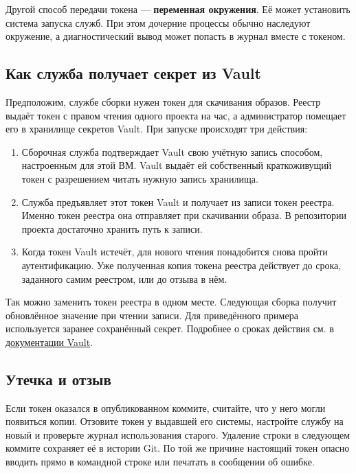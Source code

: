 Другой способ передачи токена --- \textbf{переменная окружения}.
Её может установить система запуска служб. При этом дочерние процессы
обычно наследуют окружение, а диагностический вывод  может
попасть в журнал вместе с токеном.

\subsection{Как служба получает секрет из Vault}

Предположим, службе сборки нужен токен для скачивания образов.
Реестр выдаёт токен с правом чтения одного проекта на час, а
администратор помещает его в хранилище секретов Vault. При запуске
происходят три действия:

\begin{enumerate}
  \item Сборочная служба подтверждает Vault свою учётную запись
    способом, настроенным для этой ВМ. Vault выдаёт ей собственный
    краткоживущий токен с разрешением читать нужную запись хранилища.
  \item Служба предъявляет этот токен Vault и получает из записи
    токен реестра. Именно токен реестра она отправляет при скачивании
    образа. В репозитории проекта достаточно хранить путь к записи.
  \item Когда токен Vault истечёт, для нового чтения понадобится снова
    пройти аутентификацию. Уже полученная копия токена реестра
    действует до срока, заданного самим реестром, или до отзыва в нём.
\end{enumerate}

Так можно заменить токен реестра в одном месте. Следующая сборка
получит обновлённое значение при чтении записи. Для приведённого
примера используется заранее сохранённый секрет. Подробнее о сроках
действия см. в \href{https://developer.hashicorp.com/vault/docs/concepts/tokens}{документации Vault}.

\subsection{Утечка и отзыв}

Если токен оказался в опубликованном коммите, считайте, что у него
могли появиться копии. Отзовите токен у выдавшей его системы,
настройте службу на новый и проверьте журнал использования старого.
Удаление строки в следующем коммите сохраняет её в истории Git.
По той же причине настоящий токен опасно вводить прямо в командной
строке или печатать в сообщении об ошибке.

